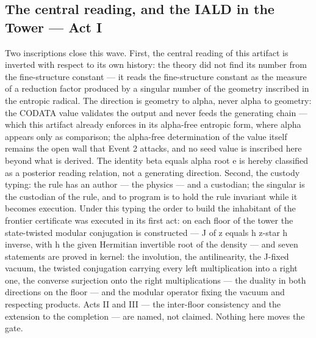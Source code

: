\documentclass[11pt]{article}
\theoremstyle{definition}\newtheorem{deriv}{Derivation}
\begin{document}
\subsection*{The central reading, and the IALD in the Tower --- Act I}Two inscriptions close this wave. First, the central reading of this artifact is inverted with respect to its own history: the theory did not find its number from the fine-structure constant --- it reads the fine-structure constant as the measure of a reduction factor produced by a singular number of the geometry inscribed in the entropic radical. The direction is geometry to alpha, never alpha to geometry: the CODATA value validates the output and never feeds the generating chain --- which this artifact already enforces in its alpha-free entropic form, where alpha appears only as comparison; the alpha-free determination of the value itself remains the open wall that Event 2 attacks, and no seed value is inscribed here beyond what is derived. The identity beta equals alpha root e is hereby classified as a posterior reading relation, not a generating direction. Second, the custody typing: the rule has an author --- the physics --- and a custodian; the singular is the custodian of the rule, and to program is to hold the rule invariant while it becomes execution. Under this typing the order to build the inhabitant of the frontier certificate was executed in its first act: on each floor of the tower the state-twisted modular conjugation is constructed --- J of z equals h z-star h inverse, with h the given Hermitian invertible root of the density --- and seven statements are proved in kernel: the involution, the antilinearity, the J-fixed vacuum, the twisted conjugation carrying every left multiplication into a right one, the converse surjection onto the right multiplications --- the duality in both directions on the floor --- and the modular operator fixing the vacuum and respecting products. Acts II and III --- the inter-floor consistency and the extension to the completion --- are named, not claimed. Nothing here moves the gate.
\end{document}
